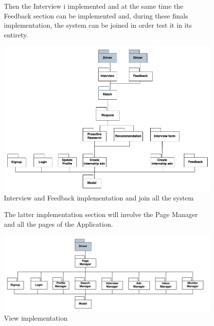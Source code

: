\begin{figure}[H]
Then the Interview i implemented and at the same time the Feedback section can be implemented and, during these finals implementation, the system can be joined in order test it in its entirety.
    \begin{center}
        \includegraphics[width=15cm]{images/IntegrationStrategy/interview_feedback.png}
        \caption{Interview and Feedback implementation and join all the system}
    \end{center}
\end{figure}

\begin{figure}[H]
The latter implementation section will involve the Page Manager and all the pages of the Application.
    \begin{center}
        \includegraphics[width=15cm]{images/IntegrationStrategy/page_manager.png}
    \caption{View implementation}
    \end{center}
\end{figure}

